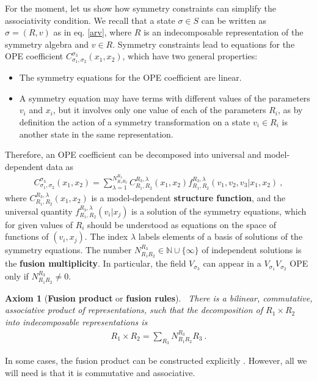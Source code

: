\documentclass[12pt, a4paper, notitlepage, twoside]{report}
\numberwithin{equation}{section}
\theoremstyle{break}
\newtheorem{hyp}{Axiom}[chapter]
\begin{document}
For the moment, let us show how symmetry constraints can simplify the associativity condition.
We recall that a state $\sigma\in S$ can be written as $\sigma=(R,v)$ as in eq. \eqref{arv}, where $R$ is an indecomposable representation of the symmetry algebra and $v\in R$.
Symmetry constraints lead to equations for the OPE coefficient 
$C_{\sigma_1,\sigma_2}^{\sigma_3}(x_1,x_2)$, which have two general properties:
\begin{itemize}
 \item The symmetry equations for the OPE coefficient are linear.
\item A symmetry equation may have terms with different values of the parameters $v_i$ and $x_i$, but it involves only one value of each of the parameters $R_i$, as by definition the action of a symmetry transformation on a state $v_i\in R_i$ is another state in the same representation. 
\end{itemize}
Therefore, an OPE coefficient can be decomposed into universal and model-dependent data as
\begin{align}
 C_{\sigma_1,\sigma_2}^{\sigma_3}(x_1,x_2) = \sum_{\lambda=1}^{N_{R_1R_2}^{R_3}} C_{R_1,R_2}^{R_3,\lambda}(x_1,x_2) f_{R_1,R_2}^{R_3,\lambda}(v_1,v_2,v_3|x_1,x_2)\ ,
\label{clcf}
\end{align}
where $C_{R_1,R_2}^{R_3,\lambda}(x_1,x_2)$ is a model-dependent \textbf{\boldmath structure function}, and 
the universal quantity $f_{R_1,R_2}^{R_3,\lambda}(v_i|x_j)$ is a solution of the symmetry equations, which for given values of $R_i$ should be understood as equations on the space of functions of $(v_i,x_j)$.
The index $\lambda$ labels elements of a basis of solutions of the symmetry equations.
The number $N_{R_1R_2}^{R_3}\in {\mathbb{N}} \cup \{\infty\}$ of independent solutions is the \textbf{\boldmath fusion multiplicity}. 
In particular, the field $V_{\sigma_3}$ can appear in a $V_{\sigma_1}V_{\sigma_2}$ OPE only if $N_{R_1R_2}^{R_3}\neq 0$.

\begin{hyp}[\textbf{\boldmath Fusion product} or \textbf{\boldmath fusion rules}]
 ~\label{ax:fp}
 There is a bilinear, commutative, associative product of representations, such that the decomposition of $R_1\times R_2$ into indecomposable representations is 
 \begin{align}
 R_1 \times R_2  = \sum_{R_3} N_{R_1R_2}^{R_3} R_3 \ . 
\label{rrnr}
\end{align}
\end{hyp} 
\noindent
In some cases, the fusion product can be constructed explicitly \cite{gab99}. However, all we will need is that it is commutative and associative. 
\end{document}
